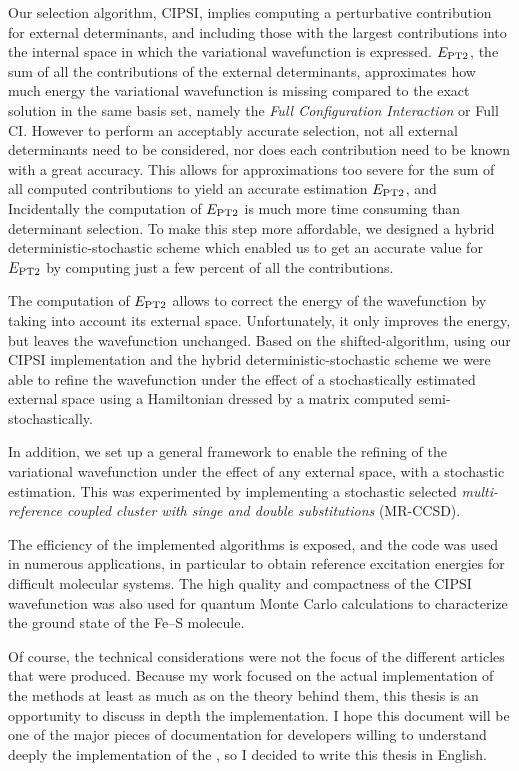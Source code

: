 \documentclass[12pt,a4paper]{report}
\begin{document}
Our selection algorithm, CIPSI, implies computing a perturbative contribution
for external determinants, and including those with the largest contributions into
the internal space in which the variational wavefunction is expressed.
$E_\text{PT2}$, the sum of all the contributions of the external determinants,
approximates how much energy the variational wavefunction is missing compared
to  the exact solution in the same basis set, namely the \emph{Full Configuration Interaction} or Full CI. However to
perform an acceptably accurate selection, not all external determinants need to
be considered, nor does each contribution need to be known with a great accuracy.\cite{Evangelisti_1983}
This allows for approximations too severe for the sum of all computed
contributions to yield an accurate estimation $E_\text{PT2}$, and Incidentally the computation
of $E_\text{PT2}$ is much more time consuming than determinant selection. To
make this step more affordable, we designed a hybrid deterministic-stochastic
scheme which enabled us to get an accurate value for $E_\text{PT2}$ by
computing just a few percent of all the contributions.

The computation of $E_\text{PT2}$ allows to correct the energy of the 
wavefunction by taking into account its external space. Unfortunately, it only
improves the energy, but leaves the wavefunction unchanged. Based on the
shifted-\Bk algorithm, using our CIPSI implementation and the hybrid
deterministic-stochastic scheme we were able to refine the wavefunction under
the effect of a stochastically estimated external space using
a Hamiltonian dressed by a matrix computed semi-stochastically.

In addition, we set up a general framework to enable the refining of the
variational wavefunction under the effect of any
external space, with a stochastic estimation.
This was experimented by implementing a stochastic selected \emph{multi-reference
coupled cluster with singe and double substitutions} (MR-CCSD).

The efficiency of the implemented algorithms is exposed, and the code
was used in numerous applications, in particular to obtain reference
excitation energies for difficult molecular systems. The high quality
and compactness of the CIPSI wavefunction was also used for quantum Monte Carlo
calculations to characterize the ground state of the Fe--S molecule.

Of course, the technical considerations were not the focus of the different
articles that were produced. Because my work focused on the actual
implementation of the methods at least as much as on the theory behind them,
this thesis is an opportunity to discuss in depth the implementation.
I hope this document will be one of the major pieces of documentation for
developers willing to understand deeply the implementation of the \QP, 
so I decided to write this thesis in English.
\end{document}
